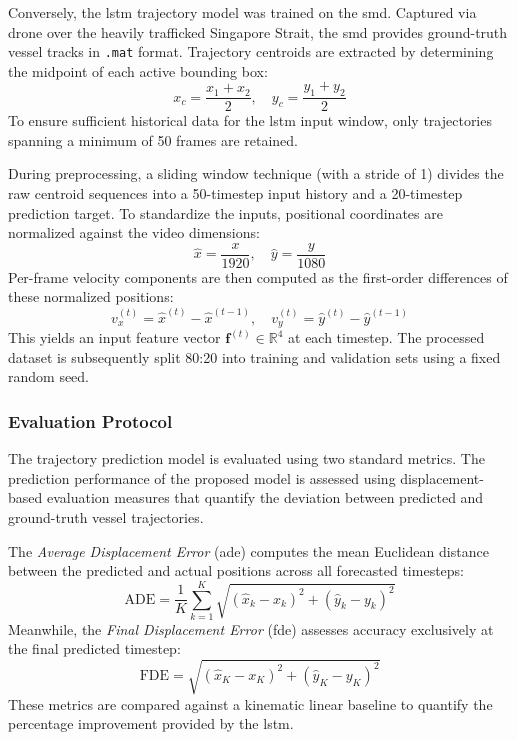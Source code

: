 Conversely, the \gls{lstm} trajectory model was trained on the \gls{smd}. Captured via drone over the heavily trafficked Singapore Strait, the \gls{smd} provides ground-truth vessel tracks in \texttt{.mat} format. Trajectory centroids are extracted by determining the midpoint of each active bounding box:
\begin{equation}
    x_c = \frac{x_1 + x_2}{2}, \quad y_c = \frac{y_1 + y_2}{2}
    \label{eq:centroid}
\end{equation}
To ensure sufficient historical data for the \gls{lstm} input window, only trajectories spanning a minimum of 50 frames are retained. 

During preprocessing, a sliding window technique (with a stride of 1) divides the raw centroid sequences into a 50-timestep input history and a 20-timestep prediction target. To standardize the inputs, positional coordinates are normalized against the video dimensions:
\begin{equation}
    \hat{x} = \frac{x}{1920}, \quad \hat{y} = \frac{y}{1080}
    \label{eq:normalization}
\end{equation}
Per-frame velocity components are then computed as the first-order differences of these normalized positions:
\begin{equation}
    v_x^{(t)} = \hat{x}^{(t)} - \hat{x}^{(t-1)}, \quad 
    v_y^{(t)} = \hat{y}^{(t)} - \hat{y}^{(t-1)}
   \label{eq:velocity}
\end{equation}
This yields an input feature vector $\mathbf{f}^{(t)} \in \mathbb{R}^4$ at each timestep. The processed dataset is subsequently split 80:20 into training and validation sets using a fixed random seed.

\subsubsection{Evaluation Protocol}

The trajectory prediction model is evaluated using two standard metrics. The prediction performance of the proposed model is assessed using displacement-based evaluation measures that quantify the deviation between predicted and ground-truth vessel trajectories.

The \textit{Average Displacement Error} (\gls{ade}) computes the mean Euclidean distance between the predicted and actual positions across all forecasted timesteps:
\begin{equation}
    \text{ADE} = \frac{1}{K} \sum_{k=1}^{K} \sqrt{(\hat{x}_k - x_k)^2 + (\hat{y}_k - y_k)^2}
    \label{eq:LSTM1}
\end{equation}
Meanwhile, the \textit{Final Displacement Error} (\gls{fde}) assesses accuracy exclusively at the final predicted timestep:
\begin{equation}
    \text{FDE} = \sqrt{(\hat{x}_K - x_K)^2 + (\hat{y}_K - y_K)^2}
    \label{eq:LSTM2}
\end{equation}
These metrics are compared against a kinematic linear baseline to quantify the percentage improvement provided by the \gls{lstm}.

